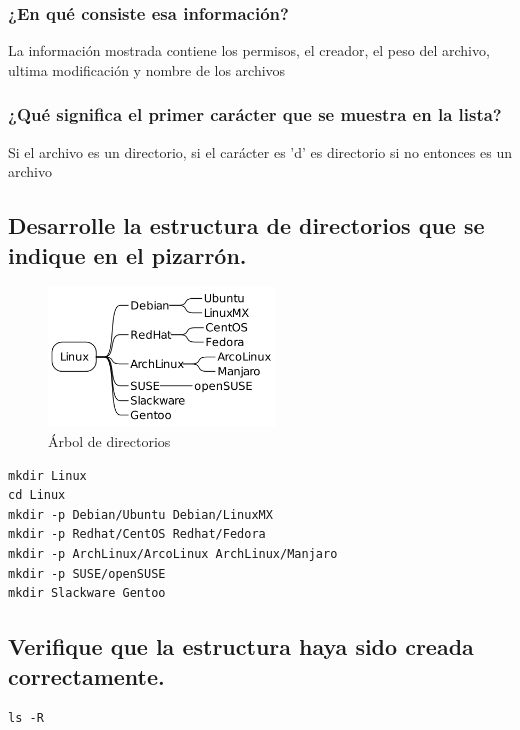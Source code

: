 \documentclass[11pt]{article}
\begin{document}
\subsubsection*{¿En qué consiste esa información?}
\label{sec:org98c6156}
\begin{mdframed}
La información mostrada contiene los permisos, el creador, el peso del archivo, ultima modificación y nombre de los archivos
\end{mdframed}

\subsubsection*{¿Qué significa el primer carácter que se muestra en la lista?}
\label{sec:org4c80872}
\begin{mdframed}
Si el archivo es un directorio, si el carácter es 'd' es directorio si no entonces es un archivo
\end{mdframed}

\subsection{Desarrolle la estructura de directorios que se indique en el pizarrón.}
\label{sec:orga4bc970}

\begin{figure}[htbp]
\centering
\includegraphics[width=6cm]{./img/tree.png}
\caption{Árbol de directorios}
\end{figure}

\begin{verbatim}
mkdir Linux
cd Linux
mkdir -p Debian/Ubuntu Debian/LinuxMX
mkdir -p Redhat/CentOS Redhat/Fedora
mkdir -p ArchLinux/ArcoLinux ArchLinux/Manjaro
mkdir -p SUSE/openSUSE
mkdir Slackware Gentoo
\end{verbatim}

\autocite{TecAdmin_2023}

\subsection{Verifique que la estructura haya sido creada correctamente.}
\label{sec:org71a2a75}
\begin{verbatim}
ls -R
\end{verbatim}
\end{document}

